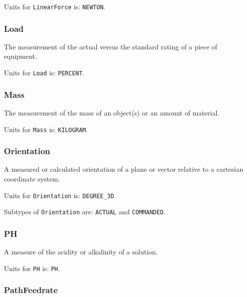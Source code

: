 Units for \texttt{LinearForce} is: \texttt{NEWTON}.

\FloatBarrier

\subsubsection{Load}
  \label{sec:Load}



The measurement of the actual versus the standard rating of a piece of equipment.


Units for \texttt{Load} is: \texttt{PERCENT}.

\FloatBarrier

\subsubsection{Mass}
  \label{sec:Mass}



The measurement of the mass of an object(s) or an amount of material.


Units for \texttt{Mass} is: \texttt{KILOGRAM}.

\FloatBarrier

\subsubsection{Orientation}
  \label{sec:Orientation}



A measured or calculated orientation of a plane or vector relative to a cartesian coordinate system.


Units for \texttt{Orientation} is: \texttt{DEGREE_3D}.


Subtypes of \texttt{Orientation} are: \texttt{ACTUAL} and \texttt{COMMANDED}. 
\FloatBarrier

\subsubsection{PH}
  \label{sec:PH}



A measure of the acidity or alkalinity of a solution.


Units for \texttt{PH} is: \texttt{PH}.

\FloatBarrier

\subsubsection{PathFeedrate}
  \label{sec:PathFeedrate}



